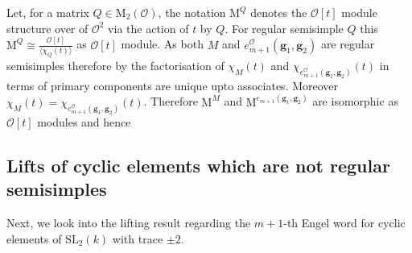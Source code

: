 \documentclass[10pt,twoside]{amsart}
\newcommand{\SL}{\mathrm{SL}}
\newcommand{\M}{\mathrm{M}}
\theoremstyle{definition}
\theoremstyle{definition}
\begin{document}
Let, for a matrix $Q\in \M_2(\mathcal{O})$, the notation $\M^Q$ denotes the $\mathcal{O}[t]$ module structure over of $\mathcal{O}^2$ via the action of $t$ by $Q$. For regular semisimple $Q$ this $\M^Q \cong\frac{\mathcal{O}[t]}{\langle \chi_Q(t)\rangle}$ as $\mathcal{O}[t]$ module. As both $M$ and $e_{m+1}^{\mathcal{O}}(\mathbf{g}_1,\mathbf{g}_2)$ are regular semisimples therefore  by \cite[theorem 5.1 (2)]{Snapper1950}  the factorisation of $\chi_{M}(t)$ and $\chi_{e_{m+1}^{\mathcal{O}}(\mathbf{g}_1,\mathbf{g}_2)}(t)$ in terms of primary components are unique upto associates. Moreover $\chi_M(t)=\chi_{e_{m+1}^{\mathcal{O}}(\mathbf{g}_1,\mathbf{g}_2)}(t)$. Therefore $\M^M$ and $\M^{e_{m+1}(\mathbf{g}_1,\mathbf{g}_2)}$ are isomorphic as $\mathcal{O}[t]$ modules and hence
\fi






\subsection{Lifts of cyclic elements which are not regular semisimples}{\label{lift regular}}

Next, we look into the lifting result regarding the $m+1$-th Engel word for cyclic elements of $\SL_2(k)$ with trace $\pm 2$.
\end{document}
